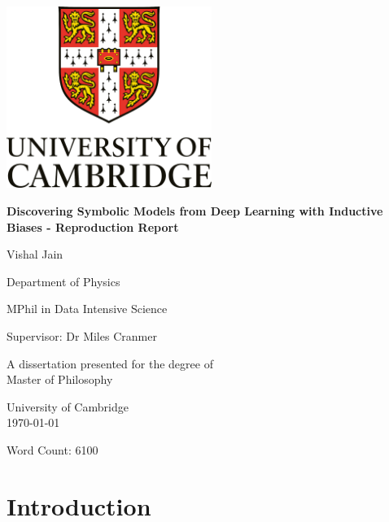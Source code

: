 \documentclass[11pt]{article}
\begin{document}
\begin{titlepage}
    \centering
    \vspace*{1cm}

    \includegraphics[width=0.5\textwidth]{figs/logo.png} %

    \vspace{1.5cm}

    {\Large\bfseries Discovering Symbolic Models from Deep Learning with Inductive Biases - Reproduction Report\par}

    \vspace{2cm}

    {\Large Vishal Jain \par}

    \vspace{1cm}

    {\large Department of Physics \par}
    \vspace{1cm}
    {\large MPhil in Data Intensive Science \par}
    \vspace{1cm}
    {\large Supervisor: Dr Miles Cranmer \par}

    \vfill
    A dissertation presented for the degree of\\
    Master of Philosophy

    \vspace{0.8cm}

    \Large University of Cambridge\\
    \today %

\end{titlepage}
Word Count: 6100
\tableofcontents
\newpage
\section{Introduction}
\end{document}
